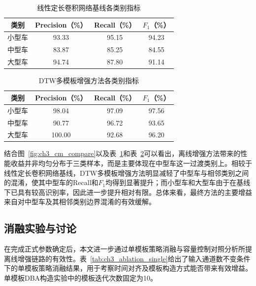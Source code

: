 \documentclass{xdupgthesis}
\providecommand{\FloatBarrier}{}
\begin{document}
\begin{table}[!htbp]
\centering
{}
\caption{线性定长卷积网络基线各类别指标}
\label{tab:ch3_prf_cnn}
\renewcommand{\arraystretch}{1.25}
\setlength{\tabcolsep}{5pt}
\begin{tabular}{c c c c}
\toprule
类别 & Precision（\%） & Recall（\%） & $F_1$（\%） \\
\midrule
小型车 & 93.33 & 95.15 & 94.23 \\
中型车 & 83.87 & 85.25 & 84.55 \\
大型车 & 94.74 & 87.80 & 91.14 \\
\bottomrule
\end{tabular}
\end{table}

\begin{table}[!htbp]
\centering
{}
\caption{DTW多模板增强方法各类别指标}
\label{tab:ch3_prf_dtw}
\renewcommand{\arraystretch}{1.25}
\setlength{\tabcolsep}{5pt}
\begin{tabular}{c c c c}
\toprule
类别 & Precision（\%） & Recall（\%） & $F_1$（\%） \\
\midrule
小型车 & 98.04 & 97.09 & 97.56 \\
中型车 & 90.77 & 96.72 & 93.65 \\
大型车 & 100.00 & 92.68 & 96.20 \\
\bottomrule
\end{tabular}
\end{table}

结合图~\ref{fig:ch3_cm_compare}以及表~\ref{tab:ch3_prf_cnn}和表~\ref{tab:ch3_prf_dtw}可以看出，离线增强方法带来的性能收益并非均匀分布于三类样本，而是主要体现在中型车这一过渡类别上。相较于线性定长卷积网络基线，DTW多模板增强方法明显减轻了中型车与相邻类别之间的混淆，使其中型车的Recall和$F_1$均得到显著提升；而小型车和大型车由于在基线下已具有较高识别率，因此进一步提升相对有限。总体来看，最终方法的主要增益来自对中型车及其相邻类别边界混淆的有效缓解。

\FloatBarrier

\subsection{消融实验与讨论}
\label{subsec:ch3_ablation}

在完成正式参数确定后，本文进一步通过单模板策略消融与容量控制对照分析所提离线增强链路的有效性。表~\ref{tab:ch3_ablation_single}给出了输入通道数不变条件下的单模板策略消融结果，用于考察时间对齐及模板构造方式能否带来有效增益。单模板DBA构造实验中的模板迭代次数固定为10。
\end{document}
